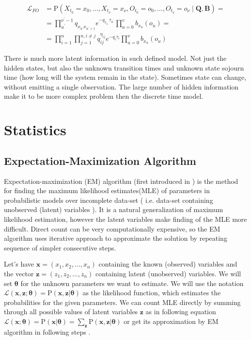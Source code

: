 \documentclass[thesis=M,english]{FITthesis}[2012/10/20]
\newcommand{\matr}[1]{\mathbf{#1}}
\begin{document}
\begin{equation}\label{eq:HMCL1}
\begin{aligned} 
			\mathcal{L}_{FO} &= \mathrm{P}(X_{t_0} = x_0, \dots ,X_{t_\nu} = x_\nu, O_{t_0} = o_0, \dots ,O_{t_\nu} = o_\nu \mid \matr{Q}, \matr{B} ) = \\
  &= \prod_{u^{'}}^{\nu^{'}-1} q_{x_{u^{'}} x_{u^{'}+1}} e^{ - q_{x_{u^{'}}} \tau_{u^{'}} } 
    \prod_{u=0}^v b_{ x_u }(o_u) = \\
    &= \prod_{i=1}^{n} \prod_{j=1}^{n, i \neq j} q_{ij}^{\eta_{ij} } e^{ - q_i \tau_i } \prod_{u=0}^\nu b_{x_u}(o_u)
\end{aligned}
\end{equation}

There is much more latent information in such defined model. Not just the hidden states, but also the unknown transition times and unknown state sojourn time (how long will the system remain in the state).
Sometimes state can change, without emitting a single observation. The large number of hidden information make it to be more complex problem then the discrete time model.

\chapter{Statistics}


\section{Expectation-Maximization Algorithm}\label{ch:EM}

Expectation-maximization (EM) algorithm (first introduced in \cite{De77}) is the method for finding the maximum likelihood estimates(MLE) of parameters in probabilistic models over incomplete data-set ( i.e. data-set containing unobserved (latent) variables ). It is a natural generalization of maximum likelihood estimation, however the latent variables make finding of the MLE more difficult. Direct count can be very computationally expensive, so the EM algorithm uses iterative approach to approximate the solution by repeating sequence of simpler consecutive steps.

Let's have $\mathbf{x} = (x_{1},x_{2},\dotsc,x_{n})$ containing the known (observed) variables and the vector $\mathbf{z} = (z_{1},z_{2},\dotsc,z_{n})$ containing latent (unobserved) variables. We will set $\boldsymbol{\theta}$ for the unknown parameters we want to estimate. We will use the notation $\mathcal{L}(\mathbf{x},\mathbf{z}; \boldsymbol{\theta}) = \mathrm{P}(\mathbf{x},\mathbf{z} | \boldsymbol{\theta})$ as the likelihood function, which estimates the probabilities for the given parameters. We can count MLE directly by summing through all possible values of latent variables $\matr{z}$ as in following equation $\mathcal{L}(\mathbf{x};\boldsymbol{\theta}) = \mathrm{P}(\mathbf{x} | \boldsymbol{\theta}) = \sum\limits_{\matr{z}} \mathrm{P}(\mathbf{x},\mathbf{z} | \boldsymbol{\theta})$ or get its approximation by EM algorithm in following steps \cite{Li14}.
\end{document}

